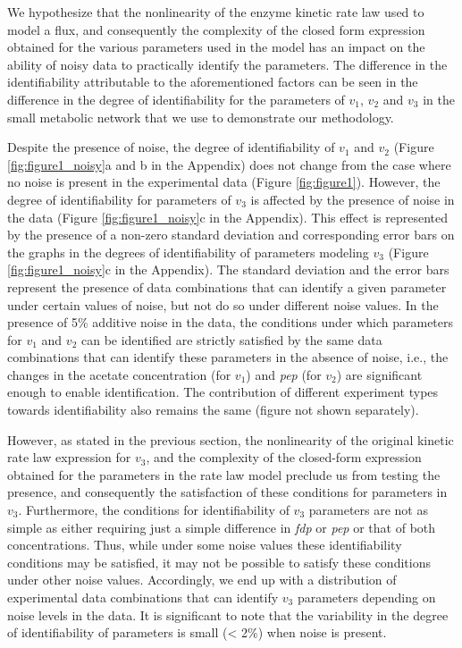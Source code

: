 \documentclass[10pt]{article}
\begin{document}
	We hypothesize that the nonlinearity of the enzyme kinetic rate law used to model a flux, and consequently the complexity of the closed form expression obtained for the various parameters used in the model has an impact on the ability of noisy data to practically identify the parameters. The difference in the identifiability attributable to the aforementioned factors can be seen in the difference in the degree of identifiability for the parameters of $v_1$, $v_2$ and $v_3$ in the small metabolic network that we use to demonstrate our methodology. 
	
	Despite the presence of noise, the degree of identifiability of $v_1$ and $v_2$ (Figure \ref{fig:figure1_noisy}a and b in the Appendix) does not change from the case where no noise is present in the experimental data (Figure \ref{fig:figure1}). However, the degree of identifiability for parameters of $v_3$ is affected by the presence of noise in the data (Figure \ref{fig:figure1_noisy}c in the Appendix). This effect is represented by the presence of a non-zero standard deviation and corresponding error bars on the graphs in the degrees of identifiability of parameters modeling $v_3$ (Figure \ref{fig:figure1_noisy}c in the Appendix). The standard deviation and the error bars represent the presence of data combinations that can identify a given parameter under certain values of noise, but not do so under different noise values. In the presence of 5\% additive noise in the data, the conditions under which parameters for $v_1$ and $v_2$ can be identified are strictly satisfied by the same data combinations that can identify these parameters in the absence of noise, i.e., the changes in the acetate concentration (for $v_1$) and \textit{pep} (for $v_2$) are significant enough to enable identification. The contribution of different experiment types towards identifiability also remains the same (figure not shown separately).
	
	However, as stated in the previous section, the nonlinearity of the original kinetic rate law expression for $v_3$, and the complexity of the closed-form expression obtained for the parameters in the rate law model preclude us from testing the presence, and consequently the satisfaction of these conditions for parameters in $v_3$. Furthermore, the conditions for identifiability of $v_3$ parameters are not as simple as either requiring just a simple difference in \textit{fdp} or \textit{pep} or that of both concentrations. Thus, while under some noise values these identifiability conditions may be satisfied, it may not be possible to satisfy these conditions under other noise values. Accordingly, we end up with a distribution of experimental data combinations that can identify $v_3$ parameters depending on noise levels in the data. It is significant to note that the variability in the degree of identifiability of parameters is small (< 2\%) when noise is present.
	
\end{document}
